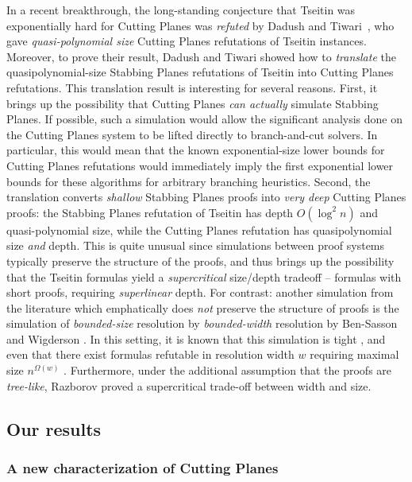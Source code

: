 In a recent breakthrough, the long-standing conjecture that Tseitin was exponentially hard for Cutting Planes was \emph{refuted} by Dadush and Tiwari~\cite{TseitinUpperBound}, who gave \emph{quasi-polynomial size} Cutting Planes refutations of Tseitin instances.  
Moreover, to prove their result, Dadush and Tiwari showed how to \emph{translate} the quasipolynomial-size Stabbing Planes refutations of Tseitin into Cutting Planes refutations.
This translation result is interesting for several reasons. 
First, it brings up the possibility that Cutting Planes \emph{can actually} simulate Stabbing Planes.
If possible, such a simulation would allow the significant analysis done on the Cutting Planes system to be lifted directly to branch-and-cut solvers. 
In particular, this would mean that the known exponential-size lower bounds for Cutting Planes refutations would immediately imply the first exponential lower bounds for these algorithms for arbitrary branching heuristics.
Second, the translation converts \emph{shallow} Stabbing Planes proofs into \emph{very deep} Cutting Planes proofs: the Stabbing Planes refutation of Tseitin has depth $O(\log^2 n)$ and quasi-polynomial size, while the Cutting Planes refutation has quasipolynomial size \emph{and} depth.
This is quite unusual since simulations between proof systems typically preserve the structure of the proofs, and thus brings up the possibility that the Tseitin formulas yield a \emph{supercritical} size/depth tradeoff -- formulas with short proofs, requiring \emph{superlinear} depth.
For contrast: another simulation from the literature which emphatically does \emph{not} preserve the structure of proofs is the simulation of \emph{bounded-size} resolution by \emph{bounded-width} resolution by Ben-Sasson and Wigderson \cite{BenSassonW01}.
In this setting, it is known that this simulation is tight \cite{BonetG01}, and even that there exist formulas refutable in resolution width $w$ requiring maximal size $n^{\Omega(w)}$ \cite{AtseriasLN16}.
Furthermore, under the additional assumption that the proofs are \emph{tree-like}, Razborov \cite{Razborov16} proved a supercritical trade-off between width and size.


\subsection{Our results}

\subsubsection{A new characterization of Cutting Planes} 


